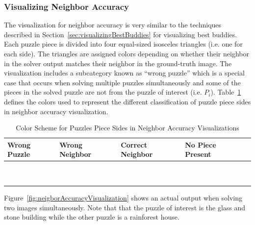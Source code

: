 \documentclass{report}
\begin{document}
\subsubsection{Visualizing Neighbor Accuracy}\label{sec:visualizingNeighborAccuracy}

The visualization for neighbor accuracy is very similar to the techniques described in Section~\ref{sec:visualizingBestBuddies} for visualizing best buddies.  Each puzzle piece is divided into four equal-sized isosceles triangles (i.e. one for each side).  The triangles are assigned colors depending on whether their neighbor in the solver output matches their neighbor in the ground-truth image.  The visualization includes a subcategory known as ``wrong puzzle'' which is a special case that occurs when solving multiple puzzles simultaneously and some of the pieces in the solved puzzle are not from the puzzle of interest (i.e. $P_i$).  Table~\ref{tab:neighborAccuracyColors} defines the colors used to represent the different classification of puzzle piece sides in neighbor accuracy visualization.

\begin{table}[h]
\begin{center}
  \begin{tabular}{ | >{\centering\arraybackslash}m{0.6in} | >{\centering\arraybackslash}m{0.6in} | >{\centering\arraybackslash}m{0.6in} | >{\centering\arraybackslash}m{0.6in} | >{\centering\arraybackslash}m{0.6in} | }
 \hline
    Wrong Puzzle & Wrong Neighbor & Correct Neighbor  & No Piece Present  \\ \hline
	{\cellcolor{blue}~} & {\cellcolor{red}~} & {\cellcolor{green}~} & {\cellcolor{black}~}  \\
	{\cellcolor{blue}~} & {\cellcolor{red}~} & {\cellcolor{green}~} & {\cellcolor{black}~}  \\
 \hline
  \end{tabular}
\end{center}
\caption{Color Scheme for Puzzles Piece Sides in Neighbor Accuracy Visualizations}\label{tab:neighborAccuracyColors}
\end{table}

Figure~\ref{fig:neigborAccuracyVisualization} shows an actual output when solving two images simultaneously.  Note that that the puzzle of interest is the glass and stone building while the other puzzle is a rainforest house.
\end{document}
